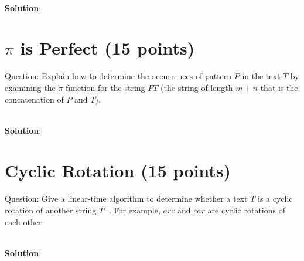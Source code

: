 \documentclass{article}
\begin{document}
~\\
\textbf{Solution}:\newline
\indent 

\section{$\pi$ is Perfect (15 points)}
Question: Explain how to determine the occurrences of pattern $P$ in the text $T$ by examining the $\pi$ function for the string $PT$ (the string of length $m+n$ that is the concatenation of $P$ and $T$).

~\\
\textbf{Solution}:\newline
\indent

\section{Cyclic Rotation (15 points)}
Question: Give a linear-time algorithm to determine whether a text $T$ is a cyclic rotation of another string $T'$ . For example, $arc$ and $car$ are cyclic rotations of each other.

~\\
\textbf{Solution}:\newline
\indent
\end{document}
